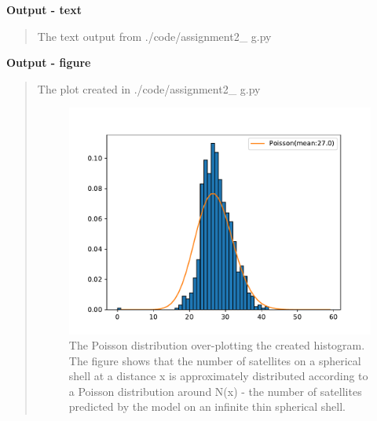 \textbf{Output - text}
\begin{quote}
The text output from \textsf{./code/assignment2\_ g.py}

\end{quote}

\newpage

\textbf{Output - figure}
\begin{quote}
The plot created in \textsf{./code/assignment2\_ g.py}
\begin{figure}[!h]
\centering
\includegraphics[scale=0.7]{plots/poisson.pdf}
\caption{The Poisson distribution over-plotting the created histogram. The figure shows that the number of satellites on a spherical shell at a distance x is approximately distributed according to a Poisson distribution around N(x) - the number of satellites predicted by the model on an infinite thin spherical shell. }
\end{figure}
\end{quote}












